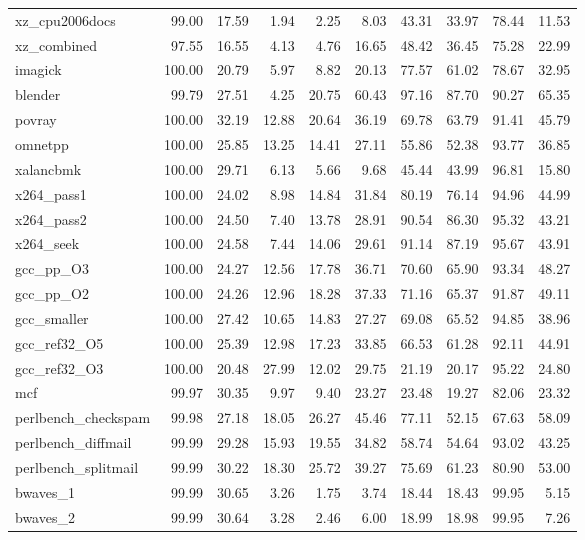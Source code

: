 \documentclass[10pt,a4paper]{article}
\begin{document}
{\begin{longtable}{@{}lrrrrrrrrr@{}}
xz\_cpu2006docs & 99.00 & 17.59 & 1.94 & 2.25 & 8.03 & 43.31 & 33.97 & 78.44 & 11.53 \\
xz\_combined & 97.55 & 16.55 & 4.13 & 4.76 & 16.65 & 48.42 & 36.45 & 75.28 & 22.99 \\
imagick & 100.00 & 20.79 & 5.97 & 8.82 & 20.13 & 77.57 & 61.02 & 78.67 & 32.95 \\
blender & 99.79 & 27.51 & 4.25 & 20.75 & 60.43 & 97.16 & 87.70 & 90.27 & 65.35 \\
povray & 100.00 & 32.19 & 12.88 & 20.64 & 36.19 & 69.78 & 63.79 & 91.41 & 45.79 \\
omnetpp & 100.00 & 25.85 & 13.25 & 14.41 & 27.11 & 55.86 & 52.38 & 93.77 & 36.85 \\
xalancbmk & 100.00 & 29.71 & 6.13 & 5.66 & 9.68 & 45.44 & 43.99 & 96.81 & 15.80 \\
x264\_pass1 & 100.00 & 24.02 & 8.98 & 14.84 & 31.84 & 80.19 & 76.14 & 94.96 & 44.99 \\
x264\_pass2 & 100.00 & 24.50 & 7.40 & 13.78 & 28.91 & 90.54 & 86.30 & 95.32 & 43.21 \\
x264\_seek & 100.00 & 24.58 & 7.44 & 14.06 & 29.61 & 91.14 & 87.19 & 95.67 & 43.91 \\
gcc\_pp\_O3 & 100.00 & 24.27 & 12.56 & 17.78 & 36.71 & 70.60 & 65.90 & 93.34 & 48.27 \\
gcc\_pp\_O2 & 100.00 & 24.26 & 12.96 & 18.28 & 37.33 & 71.16 & 65.37 & 91.87 & 49.11 \\
gcc\_smaller & 100.00 & 27.42 & 10.65 & 14.83 & 27.27 & 69.08 & 65.52 & 94.85 & 38.96 \\
gcc\_ref32\_O5 & 100.00 & 25.39 & 12.98 & 17.23 & 33.85 & 66.53 & 61.28 & 92.11 & 44.91 \\
gcc\_ref32\_O3 & 100.00 & 20.48 & 27.99 & 12.02 & 29.75 & 21.19 & 20.17 & 95.22 & 24.80 \\
mcf & 99.97 & 30.35 & 9.97 & 9.40 & 23.27 & 23.48 & 19.27 & 82.06 & 23.32 \\
perlbench\_checkspam & 99.98 & 27.18 & 18.05 & 26.27 & 45.46 & 77.11 & 52.15 & 67.63 & 58.09 \\
perlbench\_diffmail & 99.99 & 29.28 & 15.93 & 19.55 & 34.82 & 58.74 & 54.64 & 93.02 & 43.25 \\
perlbench\_splitmail & 99.99 & 30.22 & 18.30 & 25.72 & 39.27 & 75.69 & 61.23 & 80.90 & 53.00 \\
bwaves\_1 & 99.99 & 30.65 & 3.26 & 1.75 & 3.74 & 18.44 & 18.43 & 99.95 & 5.15 \\
bwaves\_2 & 99.99 & 30.64 & 3.28 & 2.46 & 6.00 & 18.99 & 18.98 & 99.95 & 7.26 \\

\end{longtable}}
\end{document}
